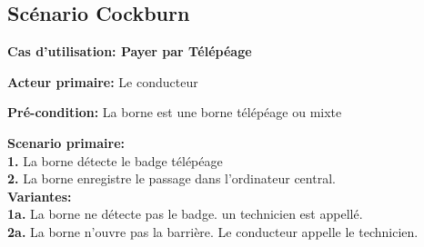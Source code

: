 \subsection{Scénario Cockburn}
\textbf{Cas d'utilisation: Payer par Télépéage}

\textbf{Acteur primaire:} Le conducteur


\textbf{Pré-condition: }  La borne est une borne télépéage ou mixte
 

\textbf{Scenario primaire: } \\
    \textbf{1.} La borne détecte le badge télépéage\\
    \textbf{2.} La borne enregistre le passage dans l’ordinateur central.\\

\textbf{Variantes:}\\
    \textbf{1a.} La borne ne détecte pas le badge. un technicien est appellé.\\
   \textbf{2a.} La borne n’ouvre pas la barrière. Le conducteur appelle le technicien.\\



\newpage
